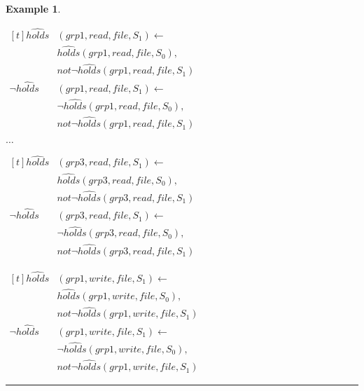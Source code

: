\documentclass[11pt, twocolumn]{article}
\newtheorem{vexmpl}{Example}
\newenvironment{vexample}
  {\begin{vexmpl}\rm}
  {\rule{2mm}{2mm}\end{vexmpl}}
\begin{document}
\begin{vexample}
\begin{enumerate}
              \begin{math}
                \begin{aligned}[t]
                  \hat{holds}&(grp1, read, file, S_{1}) \leftarrow \\
                  & \hat{holds}(grp1, read, file, S_{0}), \\
                  & not \lnot \hat{holds}(grp1, read, file, S_{1}) \\
                  \lnot \hat{holds}&(grp1, read, file, S_{1}) \leftarrow \\
                  & \lnot \hat{holds}(grp1, read, file, S_{0}), \\
                  & not \lnot \hat{holds}(grp1, read, file, S_{1})
                \end{aligned}
              \end{math}

              \hspace{1cm} $\ldots$

              \begin{math}
                \begin{aligned}[t]
                  \hat{holds}&(grp3, read, file, S_{1}) \leftarrow \\
                  & \hat{holds}(grp3, read, file, S_{0}), \\
                  & not \lnot \hat{holds}(grp3, read, file, S_{1}) \\
                  \lnot \hat{holds}&(grp3, read, file, S_{1}) \leftarrow \\
                  & \lnot \hat{holds}(grp3, read, file, S_{0}), \\
                  & not \lnot \hat{holds}(grp3, read, file, S_{1})
                \end{aligned}
              \end{math}

              \begin{math}
                \begin{aligned}[t]
                  \hat{holds}&(grp1, write, file, S_{1}) \leftarrow \\
                  & \hat{holds}(grp1, write, file, S_{0}), \\
                  & not \lnot \hat{holds}(grp1, write, file, S_{1}) \\
                  \lnot \hat{holds}&(grp1, write, file, S_{1}) \leftarrow \\
                  & \lnot \hat{holds}(grp1, write, file, S_{0}), \\
                  & not \lnot \hat{holds}(grp1, write, file, S_{1})
                \end{aligned}
              \end{math}


\end{enumerate}
\end{vexample}
\end{document}
